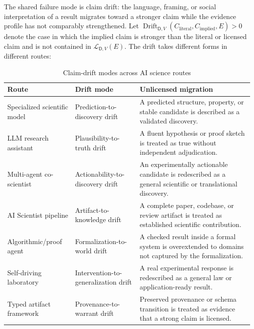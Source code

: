 \documentclass[11pt,a4paper]{article}
\newcommand{\Dom}{\mathsf{D}}
\begin{document}
The shared failure mode is claim drift: the language, framing, or social interpretation of a result migrates toward a stronger claim while the evidence profile has not comparably strengthened. Let $\operatorname{Drift}_{\Dom,V}(C_{\mathrm{literal}},C_{\mathrm{implied}},E)>0$ denote the case in which the implied claim is stronger than the literal or licensed claim and is not contained in $\mathcal{L}_{\Dom,V}(E)$. The drift takes different forms in different routes:

\begin{table}[H]
\centering
\small
\caption{Claim-drift modes across AI science routes}
\begin{tabularx}{\textwidth}{@{}p{3.1cm}p{4.2cm}Y@{}}
\toprule
Route & Drift mode & Unlicensed migration \\
\midrule
Specialized scientific model & Prediction-to-discovery drift & A predicted structure, property, or stable candidate is described as a validated discovery. \\
LLM research assistant & Plausibility-to-truth drift & A fluent hypothesis or proof sketch is treated as true without independent adjudication. \\
Multi-agent co-scientist & Actionability-to-discovery drift & An experimentally actionable candidate is redescribed as a general scientific or translational discovery. \\
AI Scientist pipeline & Artifact-to-knowledge drift & A complete paper, codebase, or review artifact is treated as established scientific contribution. \\
Algorithmic/proof agent & Formalization-to-world drift & A checked result inside a formal system is overextended to domains not captured by the formalization. \\
Self-driving laboratory & Intervention-to-generalization drift & A real experimental response is redescribed as a general law or application-ready result. \\
Typed artifact framework & Provenance-to-warrant drift & Preserved provenance or schema transition is treated as evidence that a strong claim is licensed. \\
\bottomrule
\end{tabularx}
\end{table}
\end{document}
